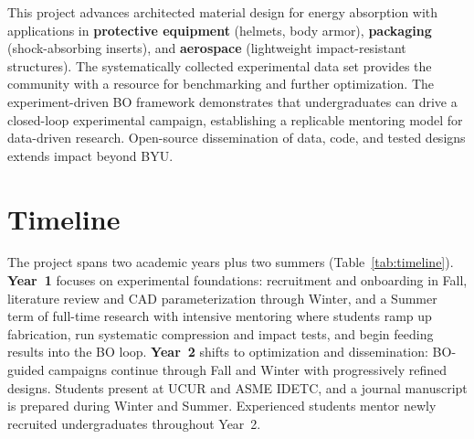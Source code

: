 \documentclass[11pt]{article}
\begin{document}
This project advances architected material design for energy absorption with
applications in \textbf{protective equipment} (helmets, body armor),
\textbf{packaging} (shock-absorbing inserts), and \textbf{aerospace}
(lightweight impact-resistant structures).  The systematically collected
experimental data set provides the community with a resource for benchmarking
and further optimization.  The experiment-driven BO framework
demonstrates that undergraduates can drive a closed-loop
experimental campaign, establishing a replicable mentoring model for
data-driven research.  Open-source dissemination of data, code, and tested designs extends
impact beyond BYU.

\section{Timeline}

The project spans two academic years plus two summers (Table~\ref{tab:timeline}).
\textbf{Year~1} focuses on experimental foundations: recruitment and
onboarding in Fall, literature review and CAD parameterization through Winter, and a Summer term of full-time research with intensive
mentoring where students ramp up
fabrication, run systematic compression and impact
tests, and begin feeding results into the BO loop.
\textbf{Year~2} shifts to optimization and dissemination: BO-guided
campaigns continue through Fall and Winter with progressively refined designs.  Students present at UCUR
and ASME IDETC, and a journal manuscript is prepared during Winter
and Summer.  Experienced students mentor newly recruited
undergraduates throughout Year~2.
\end{document}
